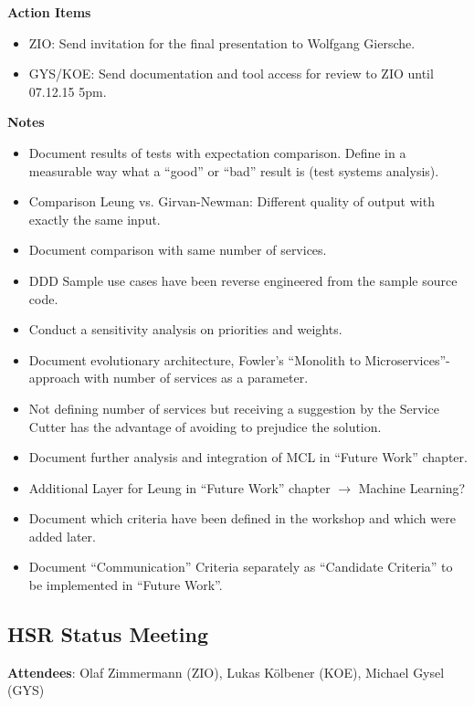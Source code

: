 \textbf{Action Items}

\begin{itemize}
\item ZIO: Send invitation for the final presentation to Wolfgang Giersche.
\item GYS/KOE: Send documentation and tool access for review to ZIO until 07.12.15 5pm.
\end{itemize}

\textbf{Notes }
\begin{itemize}
\item Document results of tests with expectation comparison. Define in a measurable way what a \enquote{good} or \enquote{bad} result is (test systems analysis).
\item Comparison Leung vs. Girvan-Newman: Different quality of output with exactly the same input. 
\item Document comparison with same number of services.
\item DDD Sample use cases have been reverse engineered from the sample source code.
\item Conduct a sensitivity analysis on priorities and weights.
\item Document evolutionary architecture, Fowler's \enquote{Monolith to Microservices}-approach with number of services as a parameter. 
\item Not defining number of services but receiving a suggestion by the Service Cutter has the advantage of avoiding to prejudice the solution.  
\item Document further analysis and integration of MCL in \enquote{Future Work} chapter.
\item Additional Layer for Leung in \enquote{Future Work} chapter $\rightarrow$ Machine Learning?
\item Document which criteria have been defined in the workshop and which were added later.  
\item Document \enquote{Communication} Criteria separately as \enquote{Candidate Criteria} to be implemented in \enquote{Future Work}.
\end{itemize}

\subsection{HSR Status Meeting }

\textbf{Attendees}: Olaf Zimmermann (ZIO), Lukas Kölbener (KOE), Michael Gysel (GYS)

